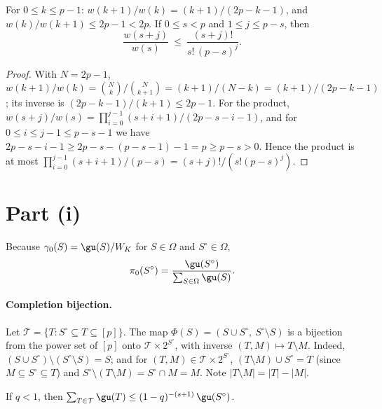 \documentclass[11pt]{report}
\begin{document}
\begin{T22lemma}\label{T22:lem:prior}
For $0\le k\le p-1$: $w(k+1)/w(k)=(k+1)/(2p-k-1)$, and $w(k)/w(k+1)\le 2p-1<2p$. If $0\le s<p$ and $1\le j\le p-s$, then
\[
\frac{w(s+j)}{w(s)}\ \le\ \frac{(s+j)!}{s!\,(p-s)^j}.
\]
\end{T22lemma}

\begin{proof}
With $N=2p-1$, $w(k+1)/w(k)=\binom{N}{k}/\binom{N}{k+1}=(k+1)/(N-k)=(k+1)/(2p-k-1)$; its inverse is $(2p-k-1)/(k+1)\le 2p-1$. For the product, $w(s+j)/w(s)=\prod_{i=0}^{j-1}(s+i+1)/(2p-s-i-1)$, and for $0\le i\le j-1\le p-s-1$ we have $2p-s-i-1\ge 2p-s-(p-s-1)-1=p\ge p-s>0$. Hence the product is at most $\prod_{i=0}^{j-1}(s+i+1)/(p-s)=(s+j)!/(s!(p-s)^j)$.
\end{proof}

\section{Part (i)}

Because $\gamma_0(S)=\gu(S)/W_K$ for $S\in\Omega$ and $S^\circ\in\Omega$,
\begin{equation}\label{T22:eq:pi0ratio}
\pi_0(S^\circ)=\frac{\gu(S^\circ)}{\sum_{S\in\Omega}\gu(S)} .
\end{equation}

\paragraph{Completion bijection.} Let $\mathcal T=\{T: S^\circ\subseteq T\subseteq[p]\}$. The map $\Phi(S)=(S\cup S^\circ,\ S^\circ\setminus S)$ is a bijection from the power set of $[p]$ onto $\mathcal T\times 2^{S^\circ}$, with inverse $(T,M)\mapsto T\setminus M$. Indeed, $(S\cup S^\circ)\setminus(S^\circ\setminus S)=S$; and for $(T,M)\in\mathcal T\times2^{S^\circ}$, $(T\setminus M)\cup S^\circ=T$ (since $M\subseteq S^\circ\subseteq T$) and $S^\circ\setminus(T\setminus M)=S^\circ\cap M=M$. Note $|T\setminus M|=|T|-|M|$.

\begin{T22lemma}\label{T22:lem:completed}
If $q<1$, then $\sum_{T\in\mathcal T}\gu(T)\le (1-q)^{-(s+1)}\,\gu(S^\circ)$.
\end{T22lemma}
\end{document}
